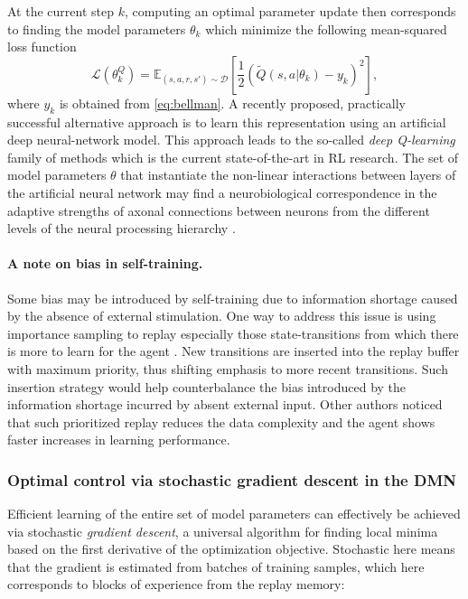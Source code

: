 \documentclass[10pt,letterpaper]{article}
\begin{document}
At the current step $k$, computing an optimal parameter update then corresponds to
finding the model parameters $\theta_{k}$ which minimize the following mean-squared loss function
\begin{equation}
  \mathcal L(\theta^Q_{k})
  = \mathbb E_{(s, a, r, s') \sim \mathcal D}\left[\frac{1}{2}(\tilde{Q}(s, a|\theta_{k}) - y_k)^2\right],
  \label{eq:oracle}
\end{equation}
where $y_k$ is obtained from \eqref{eq:bellman}.
A recently proposed, practically successful alternative approach is to learn this
representation using an artificial deep neural-network model. This approach leads to the
so-called \textit{deep Q-learning}~\citep{mnih2015,silver2016mastering} family of methods which
is the current state-of-the-art in RL research.
The set of model parameters $\theta$ that instantiate the non-linear interactions
between layers of the artificial neural network
may find a neurobiological correspondence in the adaptive strengths of axonal
connections between neurons from the different levels
of the neural processing hierarchy
\citep{mesulam1998sensation, taylor2015global}.

\paragraph*{A note on bias in self-training.}
Some bias may be introduced by self-training due to information shortage caused by the absence of external stimulation.
 One way to address this issue is using importance sampling to replay especially those state-transitions from which there is more to learn for the agent \citep{schaul2015, hessel2017}. New transitions are inserted into the replay buffer with maximum priority, thus shifting emphasis to more recent transitions. Such insertion strategy would help counterbalance the bias introduced by the information shortage incurred by absent external input. Other authors noticed \citep{hessel2017} that such prioritized replay reduces the data complexity and the agent shows faster increases in learning performance.


\subsubsection{Optimal control via stochastic gradient descent in the DMN}
Efficient learning of the entire set of model parameters can effectively be achieved
via stochastic \textit{gradient descent}, a universal algorithm for finding
local minima based on the first derivative of the optimization objective.
Stochastic here means that the gradient is estimated from batches of training samples,
which here corresponds to blocks of experience from the replay memory:
\end{document}

